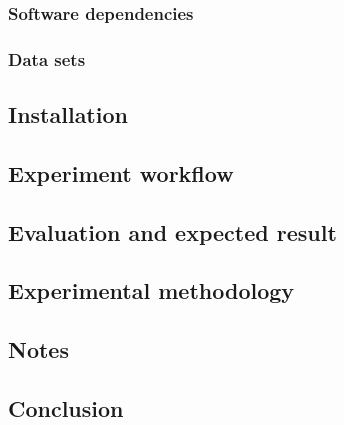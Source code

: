 \subsubsection{Software dependencies}

\subsubsection{Data sets}

\subsection{Installation}

\subsection{Experiment workflow}

\subsection{Evaluation and expected result}

\subsection{Experimental methodology}
\label{experimental_methodology}


\subsection{Notes}
\label{notes}

\subsection{Conclusion}

